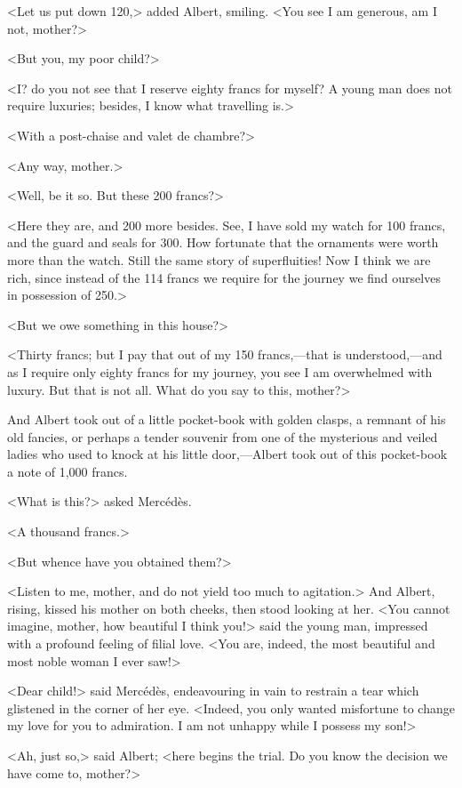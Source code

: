 <Let us put down 120,> added Albert, smiling. <You see I am generous, am I not, mother?> 

 <But you, my poor child?> 

 <I? do you not see that I reserve eighty francs for myself? A young man does not require luxuries; besides, I know what travelling is.> 

 <With a post-chaise and valet de chambre?> 

 <Any way, mother.> 

 <Well, be it so. But these 200 francs?> 

 <Here they are, and 200 more besides. See, I have sold my watch for 100 francs, and the guard and seals for 300. How fortunate that the ornaments were worth more than the watch. Still the same story of superfluities! Now I think we are rich, since instead of the 114 francs we require for the journey we find ourselves in possession of 250.> 

 <But we owe something in this house?> 

 <Thirty francs; but I pay that out of my 150 francs,—that is understood,—and as I require only eighty francs for my journey, you see I am overwhelmed with luxury. But that is not all. What do you say to this, mother?> 

 And Albert took out of a little pocket-book with golden clasps, a remnant of his old fancies, or perhaps a tender souvenir from one of the mysterious and veiled ladies who used to knock at his little door,—Albert took out of this pocket-book a note of 1,000 francs. 

 <What is this?> asked Mercédès. 

 <A thousand francs.> 

 <But whence have you obtained them?> 

 <Listen to me, mother, and do not yield too much to agitation.> And Albert, rising, kissed his mother on both cheeks, then stood looking at her. <You cannot imagine, mother, how beautiful I think you!> said the young man, impressed with a profound feeling of filial love. <You are, indeed, the most beautiful and most noble woman I ever saw!> 

 <Dear child!> said Mercédès, endeavouring in vain to restrain a tear which glistened in the corner of her eye. <Indeed, you only wanted misfortune to change my love for you to admiration. I am not unhappy while I possess my son!> 

 <Ah, just so,> said Albert; <here begins the trial. Do you know the decision we have come to, mother?> 

